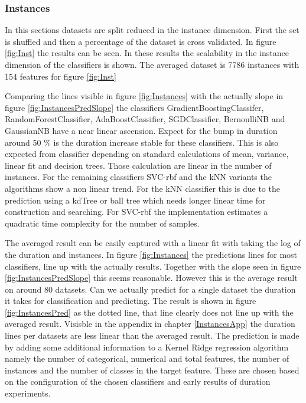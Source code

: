 \documentclass[a4paper,10pt]{article}
\begin{document}
\newpage
\subsubsection{Instances}
In this sections datasets are split reduced in the instance dimension. First the set is shuffled and then a percentage of the dataset is cross validated. In figure \ref{fig:Inst} the results can be seen. In these results the scalability in the instance dimension of the classifiers is shown. The averaged dataset is 7786 instances with 154 features for figure \ref{fig:Inst} 

Comparing the lines visible in figure \ref{fig:Instances} with the actually slope in figure \ref{fig:InstancesPredSlope} the classifiers GradientBoostingClassifer, RandomForestClassifier, AdaBoostClassifier, SGDClassifier, BernoulliNB and GaussianNB have a near linear ascension. Expect for the bump in duration around 50 $\%$ is the duration increase stable for these classifiers. This is also expected from classifier depending on standard calculations of mean, variance, linear fit and decision trees. Those calculation are linear in the number of instances. For the remaining classifiers SVC-rbf and the kNN variants the algorithms show a non linear trend. For the kNN classifier this is due to the prediction using a kdTree or ball tree which needs longer linear time for construction and searching. For SVC-rbf the implementation estimates a quadratic time complexity for the number of samples. 

The averaged result can be easily captured with a linear fit with taking the log of the duration and instances. In figure \ref{fig:Instances} the predictions lines for most classifiers, line up with the actually results. Together with the slope seen in figure \ref{fig:InstancesPredSlope} this seems reasonable. However this is the average result on around 80 datasets. Can we actually predict for a single dataset the duration it takes for classification and predicting. The result is shown in figure \ref{fig:InstancesPred} as the dotted line, that line clearly does not line up with the averaged result. Visisble in the appendix in chapter \ref{InstancesApp} the duration lines per datasets are less linear than the averaged result. The prediction is made by adding some additional information to a Kernel Ridge regression algorithm namely the number of categorical, numerical and total features, the number of instances and the number of classes in the target feature. These are chosen based on the configuration of the chosen classifiers and early results of duration experiments. 
\end{document}
